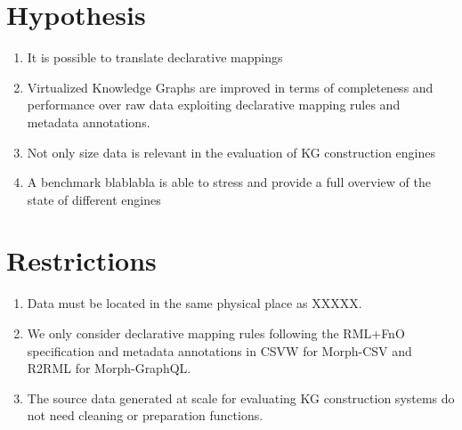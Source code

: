 \section{Hypothesis}

\begin{enumerate}[label=\textbf{H{\arabic*}}]
    \item It is possible to translate declarative mappings
    \item Virtualized Knowledge Graphs are improved in terms of completeness and performance over raw data exploiting declarative mapping rules and metadata annotations.
    \item Not only size data is relevant in the evaluation of KG construction engines
    \item A benchmark blablabla is able to stress and provide a full overview of the state of different engines 
\end{enumerate}

\section{Restrictions}

\begin{enumerate}[label=\textbf{R{\arabic*}}]
    \item Data must be located in the same physical place as XXXXX.
    \item We only consider  declarative mapping rules following the RML+FnO~\citep{de2017declarative} specification and metadata annotations in CSVW for Morph-CSV and R2RML for Morph-GraphQL.
    \item The source data generated at scale for evaluating KG construction systems do not need cleaning or preparation functions.
\end{enumerate}
